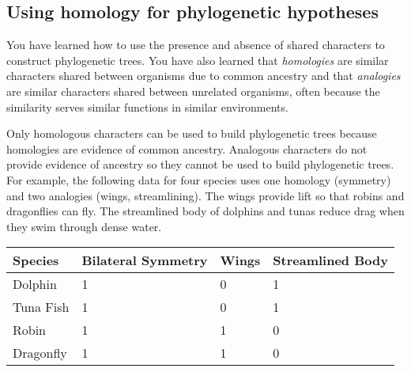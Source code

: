 \documentclass[12pt, hidelinks]{exam}
\begin{document}
\subsection*{Using homology for phylogenetic hypotheses}

You have learned how to use the presence and absence of shared
characters to construct phylogenetic trees. You have also learned that \emph{homologies}
are similar characters shared between organisms due to common ancestry and that
\emph{analogies} are similar characters shared between unrelated organisms, 
often because the similarity serves similar functions in similar environments.

Only homologous characters can be used to build phylogenetic trees because 
homologies are evidence of common ancestry. Analogous characters do not provide 
evidence of ancestry so they cannot be used to build phylogenetic trees. For example, 
the following data for four species uses one homology (symmetry) and two analogies (wings, 
streamlining). The wings provide lift so that robins and dragonflies can fly. The streamlined
body of dolphins and tunas reduce drag when they swim through dense water.


\bigskip

\begin{center}

	\begin{tabular}{lC{0.8in}C{0.6in}C{0.8in}}
		\toprule
		Species	& Bilateral Symmetry	&	Wings	&	Streamlined Body \tabularnewline
		\midrule
		Dolphin 	&	1						&	0					&	1	\tabularnewline 
		Tuna Fish	&	1						&	0					&	1	\tabularnewline
		Robin		&	1						&	1					&	0	\tabularnewline
		Dragonfly	&	1						&	1					&	0	\tabularnewline
		\bottomrule
	\end{tabular}

\bigskip


\end{center}
\end{document}
